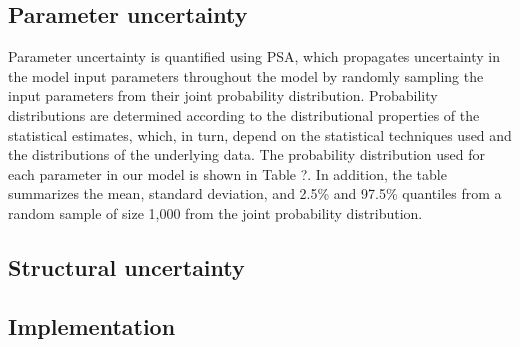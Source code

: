 \documentclass[11pt,final,fleqn]{article}\usepackage[]{graphicx}\usepackage[]{color}
\theoremstyle{plain}
\begin{document}
\subsection{Parameter uncertainty}\label{parameter-uncertainty}
Parameter uncertainty is quantified using PSA, which propagates uncertainty in the model input parameters throughout the model by randomly sampling the input parameters from their joint probability distribution. Probability distributions are determined according to the distributional properties of the statistical estimates, which, in turn, depend on the statistical techniques used and the distributions of the underlying data. The probability distribution used for each parameter in our model is shown in Table ?. In addition, the table summarizes the mean, standard deviation, and 2.5\% and 97.5\% quantiles from a random sample of size 1,000 from the joint probability distribution.   

\subsection{Structural uncertainty}\label{stuctural-uncertainty}

\subsection{Implementation}\label{implementation}
\end{document}
